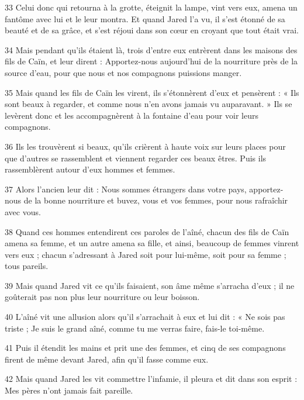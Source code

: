 \par 33 Celui donc qui retourna à la grotte, éteignit la lampe, vint vers eux, amena un fantôme avec lui et le leur montra. Et quand Jared l'a vu, il s'est étonné de sa beauté et de sa grâce, et s'est réjoui dans son cœur en croyant que tout était vrai.

\par 34 Mais pendant qu'ils étaient là, trois d'entre eux entrèrent dans les maisons des fils de Caïn, et leur dirent : Apportez-nous aujourd'hui de la nourriture près de la source d'eau, pour que nous et nos compagnons puissions manger.

\par 35 Mais quand les fils de Caïn les virent, ils s'étonnèrent d'eux et pensèrent : « Ils sont beaux à regarder, et comme nous n'en avons jamais vu auparavant. » Ils se levèrent donc et les accompagnèrent à la fontaine d'eau pour voir leurs compagnons.

\par 36 Ils les trouvèrent si beaux, qu'ils crièrent à haute voix sur leurs places pour que d'autres se rassemblent et viennent regarder ces beaux êtres. Puis ils rassemblèrent autour d’eux hommes et femmes.

\par 37 Alors l'ancien leur dit : Nous sommes étrangers dans votre pays, apportez-nous de la bonne nourriture et buvez, vous et vos femmes, pour nous rafraîchir avec vous.

\par 38 Quand ces hommes entendirent ces paroles de l'aîné, chacun des fils de Caïn amena sa femme, et un autre amena sa fille, et ainsi, beaucoup de femmes vinrent vers eux ; chacun s'adressant à Jared soit pour lui-même, soit pour sa femme ; tous pareils.

\par 39 Mais quand Jared vit ce qu'ils faisaient, son âme même s'arracha d'eux ; il ne goûterait pas non plus leur nourriture ou leur boisson.

\par 40 L'aîné vit une allusion alors qu'il s'arrachait à eux et lui dit : « Ne sois pas triste ; Je suis le grand aîné, comme tu me verras faire, fais-le toi-même.

\par 41 Puis il étendit les mains et prit une des femmes, et cinq de ses compagnons firent de même devant Jared, afin qu'il fasse comme eux.

\par 42 Mais quand Jared les vit commettre l'infamie, il pleura et dit dans son esprit : Mes pères n'ont jamais fait pareille.

